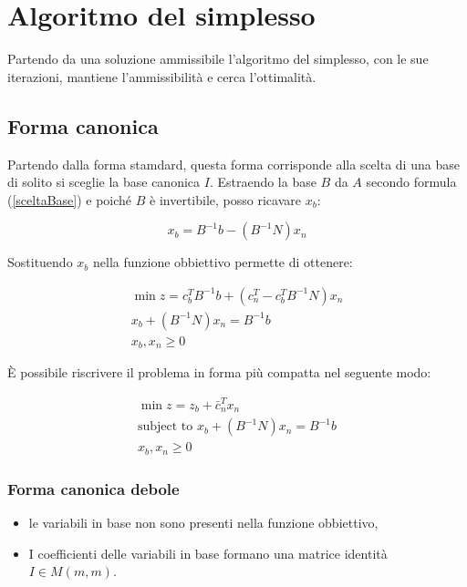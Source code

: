 \section{Algoritmo del simplesso}
Partendo da una soluzione ammissibile l'algoritmo del simplesso, con le sue iterazioni, mantiene l'ammissibilità e cerca l'ottimalità.

\subsection{Forma canonica}
Partendo dalla forma stamdard, questa forma corrisponde alla scelta di una base di solito si sceglie la base canonica $I$.
Estraendo la base $B$ da $A$ secondo formula (\ref{sceltaBase}) e poiché $B$ è invertibile, posso ricavare $x_b$:

\begin{equation}\label{xB}
x_b=B^{-1}b-(B^{-1}N)x_n
\end{equation}

Sostituendo $x_b$ nella funzione obbiettivo permette di ottenere:

\begin{equation}\label{formaCanonicaEstesa}
    \begin{array}{c}
	\min z=c_b^TB^{-1}b+(c_n^T-c_b^TB^{-1}N)x_n \\
	x_b+(B^{-1}N)x_n=B^{-1}b \\
	x_b,x_n\geq0
    \end{array}
\end{equation}

È possibile riscrivere il problema in forma più compatta nel seguente modo:

\begin{equation}\label{formaCanonicaCompatta}
    \begin{array}{c}
		\min z=z_b+\bar{c}_n^Tx_n \\
		\text{subject to } x_b+(B^{-1}N)x_n=B^{-1}b \\
		x_b,x_n\geq0
    \end{array}
\end{equation}

\subsubsection{Forma canonica debole}
\begin{itemize}
	\item le variabili in base non sono presenti nella funzione obbiettivo,
	\item I coefficienti delle variabili in base formano una matrice identità $I\in M(m,m)$.
\end{itemize}


